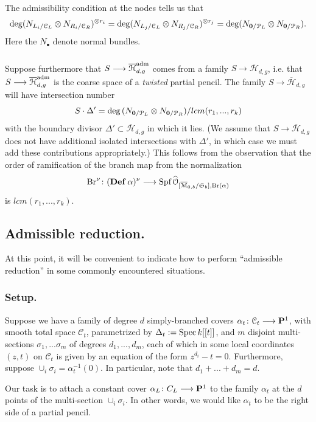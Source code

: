 \documentclass[reqno, 10 pt]{article}
\theoremstyle{definition}
\theoremstyle{remark}
\numberwithin{equation}{section}
\numberwithin{thm}{section}
\numberwithin{prop}{section}
\numberwithin{lem}{section}
\numberwithin{cor}{section}
\numberwithin{conj}{section}
\numberwithin{defn}{section}
\newcommand{\M}{\mathcal M}
\renewcommand{\H}{\mathcal H}
\newcommand{\Hdg}{\overline{\H}_{d,g}}
\newcommand{\Hdgn}{\overline{\H}_{d,g}}
\renewcommand{\to}{\longrightarrow}
\newcommand{\cC}{{\mathcal C}}
\newcommand{\cO}{{\mathcal O}}
\newcommand{\cP}{{\mathcal P}}
\renewcommand{\P}{{\bf P}}
\newcommand {\from}{{\colon}}
\newcommand{\compl}[1]{\widehat{#1}}
\newcommand{\Br}{{\rm Br}}
\renewcommand{\H}{{\mathcal{H}}}
\newcommand{\Spec}{{\text{\rm Spec}\,}}
\newcommand{\Spf}{{\text{\rm Spf}\,}}
\begin{document}
      The admissibility condition at the nodes tells us that \[\deg (N_{L_{i}/\cC_{L}}\otimes N_{R_{i}/\cC_{R}})^{\otimes r_i} = \deg (N_{L_{j}/\cC_{L}}\otimes N_{R_{j}/\cC_{R}})^{\otimes r_j} = \deg (N_{{\bf 0}/\cP_{L}}\otimes N_{{\bf 0}/\cP_{R}}).\] Here the $N_{\bullet}$ denote normal bundles. 
   
  \subsubsection{}
    Suppose furthermore that $S \to \Hdg^{\rm{adm}}$ comes from a family $S \to  \Hdgn$, i.e. that $S \to \Hdg^{\rm{adm}}$ is the coarse space of a {\sl twisted} partial pencil. The family $S \to \Hdgn$ will have intersection number \[S \cdot \Delta' = {\rm deg}\, (N_{{\bf 0}/\cP_{L}}\otimes N_{{\bf 0}/\cP_{R}})/lcm(r_1,...,r_k)\] with the boundary divisor $\Delta' \subset \Hdg$ in which it lies.  (We assume that $S \to \Hdgn$ does not have additional isolated intersections with $\Delta'$, in which case we must add these contributions appropriately.) This follows from the observation that the order of ramification of the branch map from the normalization \[\Br^{\nu} \from ({\bf Def}\, \alpha)^{\nu} \to \Spf{\compl{\cO}_{[\o{\M}_{0,b}/\mathfrak{S}_{b}], \Br(\alpha)}}\] is $lcm(r_{1},...,r_{k})$. 

\subsection{Admissible reduction.}\label{admissiblereduction}
  At this point, it will be convenient to indicate how to perform ``admissible reduction'' in some commonly encountered situations. 

  \subsubsection{Setup.}
    Suppose we have a family of degree $d$  simply-branched covers $\alpha_{t} \from \cC_{t} \to \P^{1}$, with smooth total space $\cC_{t}$, parametrized by $\Delta_{t} := \Spec k[[t]]$, and $m$ disjoint multi-sections $\sigma_{1}, ... \sigma_{m}$ of degrees $d_{1}, ... , d_{m}$, each of which in some local coordinates $(z,t)$ on $\cC_{t}$ is given by an equation of the form $z^{d_{i}} - t = 0$.  Furthermore, suppose $\cup_{i} \sigma_{i} = \alpha_{t}^{-1}(0)$. In particular, note that $d_{1} + ... + d_{m} = d$.

   Our task is to attach a constant cover $\alpha_{L} \from C_{L} \to \P^{1}$ to the family $\alpha_{t}$ at the $d$ points of the multi-section $\cup_{i}\sigma_{i}$.  In other words, we would like $\alpha_{t}$ to be the right side of a partial pencil.
\end{document}
